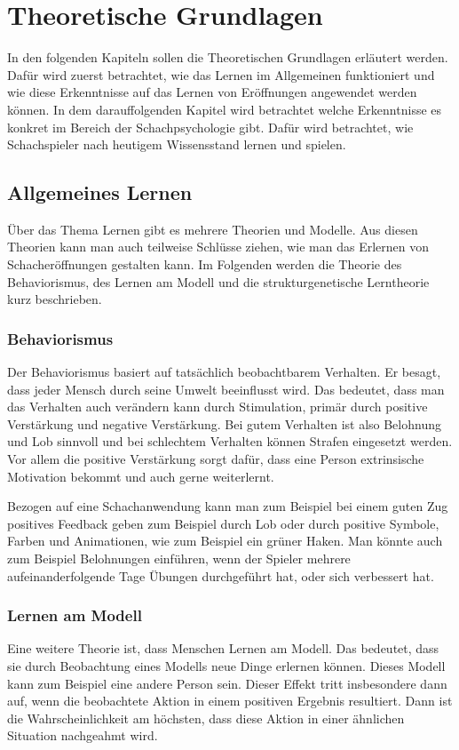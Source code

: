
\chapter{Theoretische Grundlagen}
In den folgenden Kapiteln sollen die Theoretischen Grundlagen erläutert werden. Dafür wird zuerst betrachtet, wie das Lernen im Allgemeinen funktioniert und wie diese Erkenntnisse auf das Lernen von Eröffnungen angewendet werden können.
In dem darauffolgenden Kapitel wird betrachtet welche Erkenntnisse es konkret im Bereich der Schachpsychologie gibt. Dafür wird betrachtet, wie Schachspieler nach heutigem Wissensstand lernen und spielen.

\section{Allgemeines Lernen}
Über das Thema Lernen gibt es mehrere Theorien und Modelle. Aus diesen Theorien kann man auch teilweise Schlüsse ziehen, wie man das Erlernen von Schacheröffnungen gestalten kann.
Im Folgenden werden die Theorie des Behaviorismus, des Lernen am Modell und die strukturgenetische Lerntheorie kurz beschrieben.

\subsection{Behaviorismus}
Der Behaviorismus basiert auf tatsächlich beobachtbarem Verhalten. Er besagt, dass jeder Mensch durch seine Umwelt beeinflusst wird. Das bedeutet, dass man das Verhalten auch verändern kann durch Stimulation, primär durch positive Verstärkung und negative Verstärkung. Bei gutem Verhalten ist also Belohnung und Lob sinnvoll und bei schlechtem Verhalten können Strafen eingesetzt werden. Vor allem die positive Verstärkung sorgt dafür, dass eine Person extrinsische Motivation bekommt und auch gerne weiterlernt.\cite{kron_grundwissen_2024}

Bezogen auf eine Schachanwendung kann man zum Beispiel bei einem guten Zug positives Feedback geben zum Beispiel durch Lob oder durch positive Symbole, Farben und Animationen, wie zum Beispiel ein grüner Haken. Man könnte auch zum Beispiel Belohnungen einführen, wenn der Spieler mehrere aufeinanderfolgende Tage Übungen durchgeführt hat, oder sich verbessert hat.

\subsection{Lernen am Modell}
Eine weitere Theorie ist, dass Menschen Lernen am Modell. Das bedeutet, dass sie durch Beobachtung eines Modells neue Dinge erlernen können. Dieses Modell kann zum Beispiel eine andere Person sein.
Dieser Effekt tritt insbesondere dann auf, wenn die beobachtete Aktion in einem positiven Ergebnis resultiert. Dann ist die Wahrscheinlichkeit am höchsten, dass diese Aktion in einer ähnlichen Situation nachgeahmt wird.\cite{kron_grundwissen_2024}

